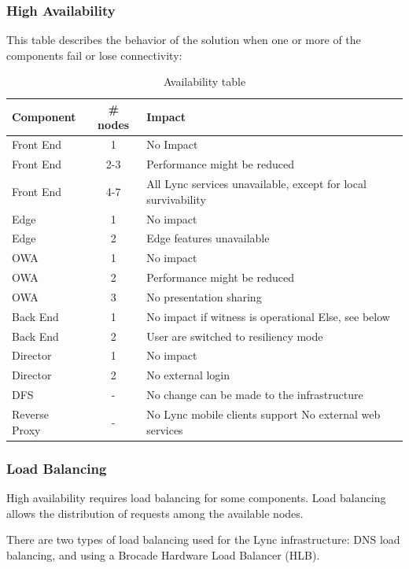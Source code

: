 \subsubsection{High Availability}
This table describes the behavior of the solution when one or more of the components fail or lose connectivity:

\begin{table}[H]
		\centering
		\begin{tabularx}{\textwidth}{lcX}
			Component & \# nodes & Impact  \\ \hline 
			Front End & 1 & No Impact \\
			Front End & 2-3 & Performance might be reduced \\
			Front End & 4-7 & All Lync services unavailable, except for local survivability \\
			Edge & 1 & No impact \\
			Edge & 2 & Edge features unavailable \\
			OWA & 1 & No impact \\
			OWA & 2 & Performance might be reduced \\
			OWA & 3 & No presentation sharing \\
			Back End & 1 &  No impact if witness is operational \newline Else, see below\\
			Back End & 2 & User are switched to resiliency mode \\
			Director & 1 & No impact \\
			Director & 2 & No external login \\
			DFS & - & No change can be made to the infrastructure \\
			Reverse Proxy & - & No Lync mobile clients support \newline No external web services \\
		\end{tabularx}
		\caption{\label{tab:case_ha} Availability table}
		\end{table}



\subsubsection{Load Balancing}
High availability requires load balancing for some components. Load balancing allows the distribution of requests among the available nodes.

There are two types of load balancing used for the Lync infrastructure: DNS load balancing, and using a Brocade Hardware Load Balancer (HLB).

